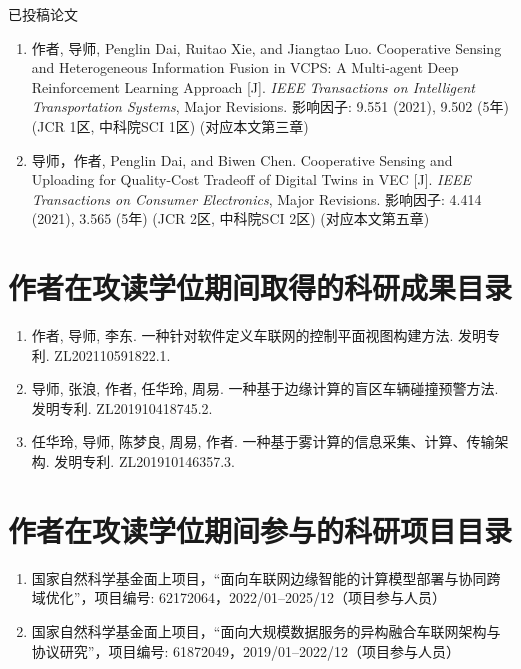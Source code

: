 已投稿论文

\begin{enumerate}
	\item 作者\textbf{}, 导师, Penglin Dai, Ruitao Xie, and Jiangtao Luo. Cooperative Sensing and Heterogeneous Information Fusion in VCPS: A Multi-agent Deep Reinforcement Learning Approach [J]. \textit{IEEE Transactions on Intelligent Transportation Systems}, Major Revisions. 影响因子: 9.551 (2021), 9.502 (5年) (JCR 1区, 中科院SCI 1区) (对应本文第三章)
	\item 导师，作者\textbf{}, Penglin Dai, and Biwen Chen. Cooperative Sensing and Uploading for Quality-Cost Tradeoff of Digital Twins in VEC [J]. \textit{IEEE Transactions on Consumer Electronics}, Major Revisions. 影响因子: 4.414 (2021), 3.565 (5年) (JCR 2区, 中科院SCI 2区) (对应本文第五章) 
\end{enumerate}

\section{作者在攻读学位期间取得的科研成果目录}
\begin{enumerate}
	\item 作者\textbf{}, 导师, 李东. 一种针对软件定义车联网的控制平面视图构建方法. 发明专利. ZL202110591822.1.
	\item 导师, 张浪, 作者\textbf{}, 任华玲, 周易. 一种基于边缘计算的盲区车辆碰撞预警方法. 发明专利. ZL201910418745.2.
	\item 任华玲, 导师, 陈梦良, 周易, 作者\textbf{}. 一种基于雾计算的信息采集、计算、传输架构. 发明专利. ZL201910146357.3.
\end{enumerate}

\section{作者在攻读学位期间参与的科研项目目录}
\begin{enumerate}
	\item 国家自然科学基金面上项目，“面向车联网边缘智能的计算模型部署与协同跨域优化”，项目编号: 62172064，2022/01–2025/12（项目参与人员）
	\item 国家自然科学基金面上项目，“面向大规模数据服务的异构融合车联网架构与协议研究”，项目编号: 61872049，2019/01–2022/12（项目参与人员）
\end{enumerate}

